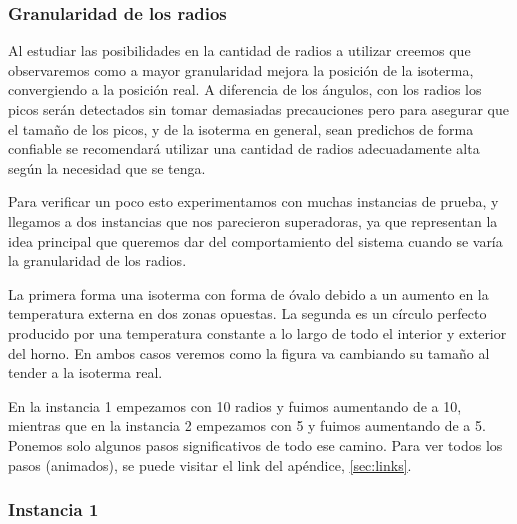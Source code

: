 \subsubsection{Granularidad de los radios}
Al estudiar las posibilidades en la cantidad de radios a utilizar creemos que observaremos como a mayor granularidad mejora la posición de la isoterma, convergiendo a la posición real. A diferencia de los ángulos, con los radios los picos serán detectados sin tomar demasiadas precauciones pero para asegurar que el tamaño de los picos, y de la isoterma en general, sean predichos de forma confiable se recomendará utilizar una cantidad de radios adecuadamente alta según la necesidad que se tenga.


Para verificar un poco esto experimentamos con muchas instancias de prueba, y llegamos a dos instancias que nos parecieron superadoras, ya que representan la idea principal que queremos dar del comportamiento del sistema cuando se varía la granularidad de los radios.

La primera forma una isoterma con forma de óvalo debido a un aumento en la temperatura externa en dos zonas opuestas. La segunda es un círculo perfecto producido por una temperatura constante a lo largo de todo el interior y exterior del horno. En ambos casos veremos como la figura va cambiando su tamaño al tender a la isoterma real.

En la instancia 1 empezamos con 10 radios y fuimos aumentando de a 10, mientras que en la instancia 2 empezamos con 5 y fuimos aumentando de a 5. Ponemos solo algunos pasos significativos de todo ese camino. Para ver todos los pasos (animados), se puede visitar el link del apéndice, \ref{sec:links}.

\subsubsection*{Instancia 1}


